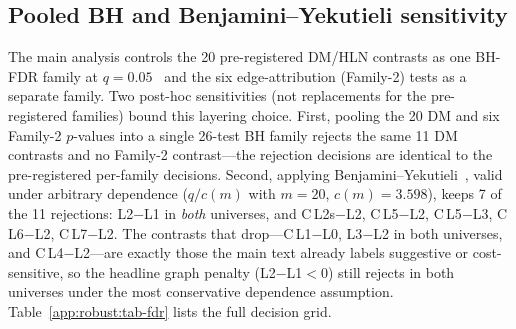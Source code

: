 \documentclass{article}
\begin{document}
\subsection{Pooled BH and Benjamini--Yekutieli sensitivity}\label{app:robust:fdr}

The main analysis controls the 20 pre-registered DM/HLN contrasts as one BH-FDR
family at $q=0.05$~\citep{benjamini1995controlling} and the six edge-attribution
(Family-2) tests as a separate family. Two post-hoc sensitivities (not
replacements for the pre-registered families) bound this layering choice. First,
pooling the 20 DM and six Family-2 $p$-values into a single 26-test BH family
rejects the same 11 DM contrasts and no Family-2 contrast---the rejection
decisions are identical to the pre-registered per-family decisions. Second,
applying Benjamini--Yekutieli~\citep{benjamini2001by}, valid under arbitrary
dependence ($q/c(m)$ with $m=20$, $c(m)=3.598$), keeps 7 of the 11 rejections:
L2$-$L1 in \emph{both} universes, and C\,L2s$-$L2, C\,L5$-$L2, C\,L5$-$L3,
C\,L6$-$L2, C\,L7$-$L2. The contrasts that drop---C\,L1$-$L0, L3$-$L2 in both
universes, and C\,L4$-$L2---are exactly those the main text already labels
suggestive or cost-sensitive, so the headline graph penalty (L2$-$L1${}<0$)
still rejects in both universes under the most conservative dependence
assumption. Table~\ref{app:robust:tab-fdr} lists the full decision grid.
\end{document}
